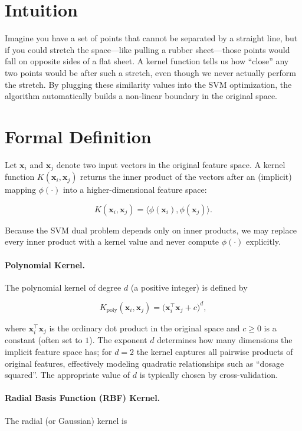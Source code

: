 \documentclass[12pt, a4paper]{article}
\begin{document}
\section{Intuition}
Imagine you have a set of points that cannot be separated by a straight line, but if you could stretch the space---like pulling a rubber sheet---those points would fall on opposite sides of a flat sheet.  A kernel function tells us how ``close'' any two points would be after such a stretch, even though we never actually perform the stretch.  By plugging these similarity values into the SVM optimization, the algorithm automatically builds a non-linear boundary in the original space.

\section{Formal Definition}
Let \(\mathbf{x}_i\) and \(\mathbf{x}_j\) denote two input vectors in the original feature space.  A kernel function \(K(\mathbf{x}_i,\mathbf{x}_j)\) returns the inner product of the vectors after an (implicit) mapping \(\phi(\cdot)\) into a higher-dimensional feature space:

\[
K(\mathbf{x}_i,\mathbf{x}_j)=\langle \phi(\mathbf{x}_i),\phi(\mathbf{x}_j)\rangle .
\]

Because the SVM dual problem depends only on inner products, we may replace every inner product with a kernel value and never compute \(\phi(\cdot)\) explicitly.

\paragraph{Polynomial Kernel.}  
The polynomial kernel of degree \(d\) (a positive integer) is defined by

\[
K_{\text{poly}}(\mathbf{x}_i,\mathbf{x}_j)=\bigl(\mathbf{x}_i^{\!\top}\mathbf{x}_j + c\bigr)^{d},
\]

where \(\mathbf{x}_i^{\!\top}\mathbf{x}_j\) is the ordinary dot product in the original space and \(c\ge 0\) is a constant (often set to \(1\)).  The exponent \(d\) determines how many dimensions the implicit feature space has; for \(d=2\) the kernel captures all pairwise products of original features, effectively modeling quadratic relationships such as ``dosage squared''.  The appropriate value of \(d\) is typically chosen by cross-validation.

\paragraph{Radial Basis Function (RBF) Kernel.}  
The radial (or Gaussian) kernel is
\end{document}
